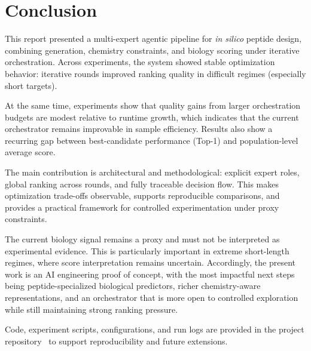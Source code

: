 \section{Conclusion}\label{sec:conclusion}
This report presented a multi-expert agentic pipeline for \textit{in silico} peptide design, combining generation, chemistry constraints, and biology scoring under iterative orchestration. Across experiments, the system showed stable optimization behavior: iterative rounds improved ranking quality in difficult regimes (especially short targets).

At the same time, experiments show that quality gains from larger orchestration budgets are modest relative to runtime growth, which indicates that the current orchestrator remains improvable in sample efficiency. Results also show a recurring gap between best-candidate performance (Top-1) and population-level average score.

The main contribution is architectural and methodological: explicit expert roles, global ranking across rounds, and fully traceable decision flow. This makes optimization trade-offs observable, supports reproducible comparisons, and provides a practical framework for controlled experimentation under proxy constraints.

The current biology signal remains a proxy and must not be interpreted as experimental evidence. This is particularly important in extreme short-length regimes, where score interpretation remains uncertain. Accordingly, the present work is an AI engineering proof of concept, with the most impactful next steps being peptide-specialized biological predictors, richer chemistry-aware representations, and an orchestrator that is more open to controlled exploration while still maintaining strong ranking pressure.

Code, experiment scripts, configurations, and run logs are provided in the project repository~\cite{multi_expert_repo} to support reproducibility and future extensions.
